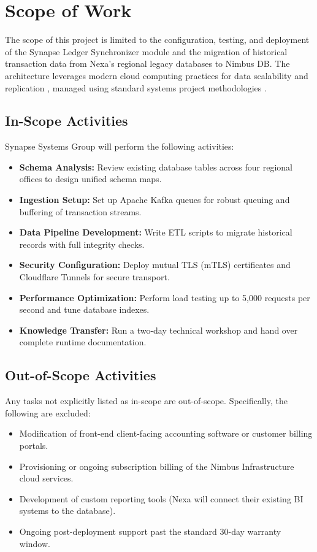 \section{Scope of Work}
The scope of this project is limited to the configuration, testing, and deployment of the Synapse Ledger Synchronizer module and the migration of historical transaction data from Nexa's regional legacy databases to Nimbus DB. The architecture leverages modern cloud computing practices for data scalability and replication \cite{cloudmigration}, managed using standard systems project methodologies \cite{projectmgmt}.

\subsection{In-Scope Activities}
Synapse Systems Group will perform the following activities:
\begin{itemize}[label=\textcolor{secondary}{\faCheck}, leftmargin=*]
  \item \textbf{Schema Analysis:} Review existing database tables across four regional offices to design unified schema maps.
  \item \textbf{Ingestion Setup:} Set up Apache Kafka queues for robust queuing and buffering of transaction streams.
  \item \textbf{Data Pipeline Development:} Write ETL scripts to migrate historical records with full integrity checks.
  \item \textbf{Security Configuration:} Deploy mutual TLS (mTLS) certificates and Cloudflare Tunnels for secure transport.
  \item \textbf{Performance Optimization:} Perform load testing up to 5,000 requests per second and tune database indexes.
  \item \textbf{Knowledge Transfer:} Run a two-day technical workshop and hand over complete runtime documentation.
\end{itemize}

\subsection{Out-of-Scope Activities}
Any tasks not explicitly listed as in-scope are out-of-scope. Specifically, the following are excluded:
\begin{itemize}[label=\textcolor{accent}{\faTimes}, leftmargin=*]
  \item Modification of front-end client-facing accounting software or customer billing portals.
  \item Provisioning or ongoing subscription billing of the Nimbus Infrastructure cloud services.
  \item Development of custom reporting tools (Nexa will connect their existing BI systems to the database).
  \item Ongoing post-deployment support past the standard 30-day warranty window.
\end{itemize}
